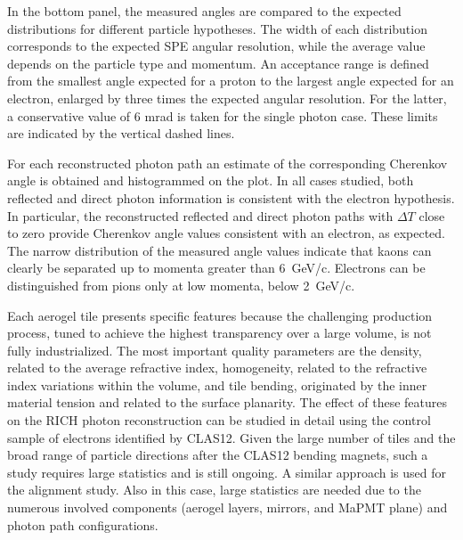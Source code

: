 \documentclass[5p,times,twocolumn]{elsarticle}
\def\dT{$\Delta T$ }
\begin{document}
In the bottom panel, the measured angles are compared to the expected distributions for different particle
hypotheses. The width of each distribution corresponds to the expected SPE angular resolution, while the average
value depends on the particle type and momentum. An acceptance range is defined from the smallest angle expected
for a proton to the largest angle expected for an electron, enlarged by three times the expected angular resolution.
For the latter, a conservative value of 6 mrad is taken for the single photon case. These limits are indicated by the
vertical dashed lines. 

For each reconstructed photon path an estimate of the corresponding Cherenkov angle is obtained and
histogrammed on the plot. In all cases studied, both reflected and direct photon information is consistent with
the electron hypothesis. In particular, the reconstructed reflected and direct photon paths with \dT close to
zero provide Cherenkov angle values consistent with an electron, as expected. The narrow distribution of the
measured angle values indicate that kaons can clearly be separated up to momenta greater than 6~GeV/c. Electrons
can be distinguished from pions only at low momenta, below 2~GeV/c.

Each aerogel tile presents specific features because the challenging production process, tuned to achieve the
highest transparency over a large volume, is not fully industrialized. The most important quality parameters are the
density, related to the average refractive index, homogeneity, related to the refractive index variations within the
volume, and tile bending, originated by the inner material tension and related to the surface planarity. The effect of
these features on the RICH photon reconstruction can be studied in detail using the control sample of electrons
identified by CLAS12. Given the large number of tiles and the broad range of particle directions after the CLAS12
bending magnets, such a study requires large statistics and is still ongoing. A similar approach is used for the
alignment study. Also in this case, large statistics are needed due to the numerous involved components (aerogel
layers, mirrors, and MaPMT plane) and photon path configurations. 
\end{document}
